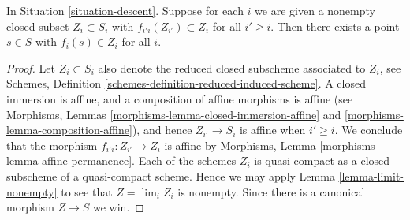 \begin{lemma}
\label{lemma-limit-closed-nonempty}
In Situation \ref{situation-descent}.
Suppose for each $i$ we are given a nonempty closed subset
$Z_i \subset S_i$ with $f_{i'i}(Z_{i'}) \subset Z_i$ for all
$i' \geq i$.
Then there exists a point $s \in S$ with $f_i(s) \in Z_i$ for
all $i$.
\end{lemma}

\begin{proof}
Let $Z_i \subset S_i$ also denote the reduced closed subscheme
associated to $Z_i$, see Schemes,
Definition \ref{schemes-definition-reduced-induced-scheme}.
A closed immersion is affine, and a composition of affine
morphisms is affine (see
Morphisms, Lemmas \ref{morphisms-lemma-closed-immersion-affine}
and \ref{morphisms-lemma-composition-affine}), and hence $Z_{i'} \to S_i$ is
affine when $i' \geq i$. We conclude that the morphism
$f_{i'i} : Z_{i'} \to Z_i$ is affine by
Morphisms, Lemma \ref{morphisms-lemma-affine-permanence}.
Each of the schemes $Z_i$ is quasi-compact as a closed
subscheme of a quasi-compact scheme. Hence we may apply
Lemma \ref{lemma-limit-nonempty} to see that
$Z = \lim_i Z_i$ is nonempty. Since there is a
canonical morphism $Z \to S$ we win.
\end{proof}
